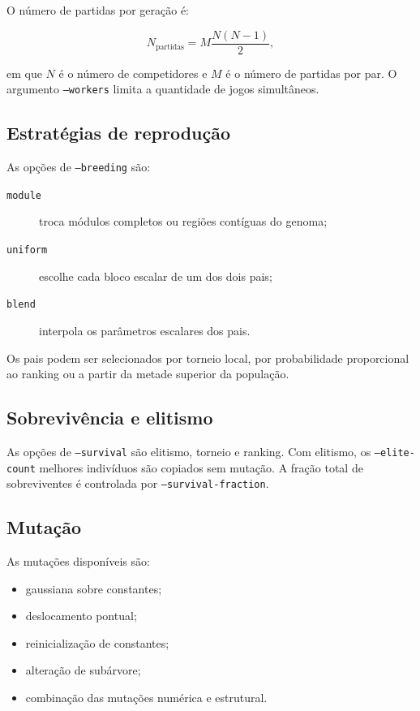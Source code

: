 \documentclass[12pt,a4paper]{article}
\begin{document}
O n\'umero de partidas por gera\c{c}\~ao \'e:

\begin{equation}
  N_{\mathrm{partidas}}=M\frac{N(N-1)}{2},
\end{equation}

em que $N$ \'e o n\'umero de competidores e $M$ \'e o n\'umero de partidas por par. O argumento \texttt{--workers} limita a quantidade de jogos simult\^aneos.

\subsection{Estrat\'egias de reprodu\c{c}\~ao}

As op\c{c}\~oes de \texttt{--breeding} s\~ao:

\begin{description}
  \item[\texttt{module}] troca m\'odulos completos ou regi\~oes cont\'iguas do genoma;
  \item[\texttt{uniform}] escolhe cada bloco escalar de um dos dois pais;
  \item[\texttt{blend}] interpola os par\^ametros escalares dos pais.
\end{description}

Os pais podem ser selecionados por torneio local, por probabilidade proporcional ao ranking ou a partir da metade superior da popula\c{c}\~ao.

\subsection{Sobreviv\^encia e elitismo}

As op\c{c}\~oes de \texttt{--survival} s\~ao elitismo, torneio e ranking. Com elitismo, os \texttt{--elite-count} melhores indiv\'iduos s\~ao copiados sem muta\c{c}\~ao. A fra\c{c}\~ao total de sobreviventes \'e controlada por \texttt{--survival-fraction}.

\subsection{Muta\c{c}\~ao}

As muta\c{c}\~oes dispon\'iveis s\~ao:

\begin{itemize}
  \item gaussiana sobre constantes;
  \item deslocamento pontual;
  \item reinicializa\c{c}\~ao de constantes;
  \item altera\c{c}\~ao de sub\'arvore;
  \item combina\c{c}\~ao das muta\c{c}\~oes num\'erica e estrutural.
\end{itemize}
\end{document}
